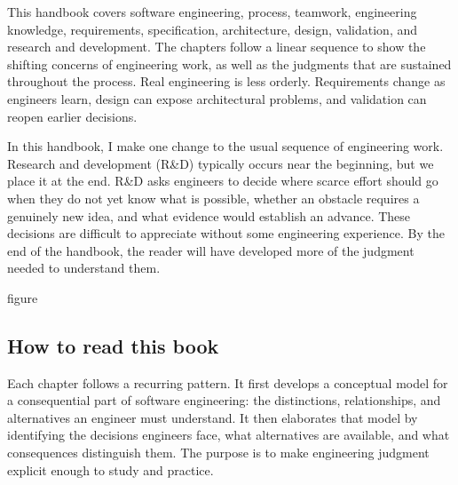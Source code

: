 This handbook covers software engineering, process, teamwork, engineering knowledge, requirements,
specification, architecture, design, validation, and research and development.
The chapters follow a linear sequence to show the shifting concerns of engineering work, as well as
the judgments that are sustained throughout the process.
Real engineering is less orderly.
Requirements change as engineers learn, design can expose architectural problems, and validation
can reopen earlier decisions.

In this handbook, I make one change to the usual sequence of engineering work.
Research and development (R\&D) typically occurs near the beginning, but we place it at the end.
R\&D asks engineers to decide where scarce effort should go when they do not yet know what is
possible, whether an obstacle requires a genuinely new idea, and what evidence would establish an
advance.
These decisions are difficult to appreciate without some engineering experience.
By the end of the handbook, the reader will have developed more of the judgment needed to
understand them.

\begin{bookbox}{figure}{} %
\pandocbounded{}
\end{bookbox}

\subsection{How to read this book}\label{how-to-read-this-book}

Each chapter follows a recurring pattern. It first develops a conceptual model for a consequential
part of software engineering: the distinctions, relationships, and alternatives an engineer must
understand. It then elaborates that model by identifying the decisions engineers face, what
alternatives are available, and what consequences distinguish them. The purpose is to make
engineering judgment explicit enough to study and practice.

